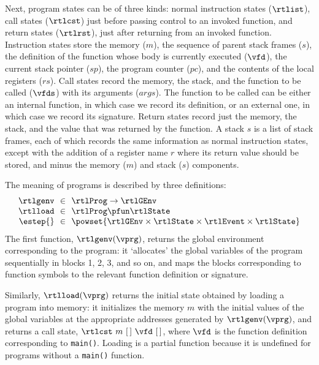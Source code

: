 Next, program states can be of three kinds: normal instruction states ($\rtlist$), call states
($\rtlcst$) just before passing control to an invoked function, and return states ($\rtlrst$), just
after returning from an invoked function.  Instruction states store the memory ($m$), the sequence
of parent stack frames ($s$), the definition of the function whose body is currently executed
($\vfd$), the current stack pointer ($sp$), the program counter ($pc$), and the contents of the
local registers ($rs$).  Call states record the memory, the stack, and the function to be called
($\vfds$) with its arguments ($args$).  The function to be called can be either an internal
function, in which case we record its definition, or an external one, in which case we record its
signature.  Return states record just the memory, the stack, and the value that was returned by the
function.  A stack $s$ is a list of stack frames, each of which records the same information as
normal instruction states, except with the addition of a register name $r$ where its return value
should be stored, and minus the memory ($m$) and stack ($s$) components.

The meaning of programs is described by three definitions:
\[
\begin{array}{r@{~~}c@{~~}l}
\rtlgenv &\in& \rtlProg \to \rtlGEnv \\
\rtlload &\in& \rtlProg \pfun \rtlState\\
\estep{} &\in& \powset{\rtlGEnv\times\rtlState\times\rtlEvent\times\rtlState}\\
\end{array}
\]
The first function, $\rtlgenv(\vprg)$, returns the global environment corresponding to the program:
it `allocates' the global variables of the program sequentially in blocks 1, 2, 3, and so on, and
maps the blocks corresponding to function symbols to the relevant function definition or signature.

Similarly, $\rtlload(\vprg)$ returns the initial state obtained by loading a program into memory: it
initializes the memory $m$ with the initial values of the global variables at the appropriate
addresses generated by $\rtlgenv(\vprg)$, and returns a call state, $\rtlcst~m~[\,]~\vfd~[\,]$,
where $\vfd$ is the function definition corresponding to \texttt{main()}.  Loading is a partial
function because it is undefined for programs without a \texttt{main()} function.

% 

